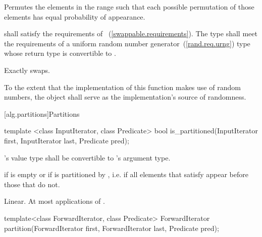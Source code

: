 \begin{itemdescr}
\pnum
\effects
Permutes the elements in the range
such that each possible permutation of those elements has equal probability of appearance.

\pnum
\requires
{} shall satisfy the requirements of
~(\ref{swappable.requirements}).
The type
 shall meet the requirements of a uniform
random number generator~(\ref{rand.req.urng}) type whose return type is
convertible to
.

\pnum
\complexity
Exactly
swaps.

\pnum
\notes
To the extent that the implementation of this function makes use of random
numbers, the object  shall serve as the implementation's source of
randomness.

\end{itemdescr}

[alg.partitions]{Partitions}

%
\begin{itemdecl}
template <class InputIterator, class Predicate>
  bool is_partitioned(InputIterator first, InputIterator last, Predicate pred);
\end{itemdecl}

\begin{itemdescr}
\pnum
\requires {}'s value type shall be convertible to 's argument type.

\pnum
\returns {} if
 is empty or if
 is partitioned by , i.e. if all elements that satisfy  appear before those that do not.

\pnum
\complexity Linear. At most  applications of .
\end{itemdescr}

%
\begin{itemdecl}
template<class ForwardIterator, class Predicate>
  ForwardIterator
    partition(ForwardIterator first,
              ForwardIterator last, Predicate pred);
\end{itemdecl}

